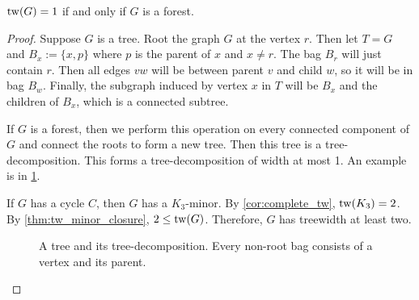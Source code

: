 \begin{lemma}\label{lem:treewidth_forest}
	\(\operatorname{tw}(G) = 1\) if and only if \(G\) is a forest.
\end{lemma}

\begin{proof}
	Suppose \(G\) is a tree. Root the graph \(G\) at the vertex \(r\). Then let \(T = G\) and \(B_x:= \lbrace x, p \rbrace\) where \(p\) is the parent of \(x\) and $x \neq r$. The bag \(B_r\) will just contain \(r\). Then all edges \(vw\) will be between parent \(v\) and child \(w\), so it will be in bag \(B_w\). Finally, the subgraph induced by vertex \(x\) in \(T\) will be \(B_x\) and the children of \(B_x\), which is a connected subtree.
	\par
	If \(G\) is a forest, then we perform this operation on every connected component of \(G\) and connect the roots to form a new tree. Then this tree is a tree-decomposition. This forms a tree-decomposition of width at most 1. An example is in \cref{fig:tree-treedecomp}.
	\par
	If \(G\) has a cycle \(C\), then $G$ has a $K_3$-minor. By \cref{cor:complete_tw}, $\operatorname{tw}(K_3) = 2$. By \cref{thm:tw_minor_closure}, $2 \leq \operatorname{tw}(G)$. Therefore, $G$ has treewidth at least two. 
	\begin{figure}[ht]
		\centering
		
		
		\caption{A tree and its tree-decomposition. Every non-root bag consists of a vertex and its parent.}\label{fig:tree-treedecomp}
	\end{figure}
\end{proof}

